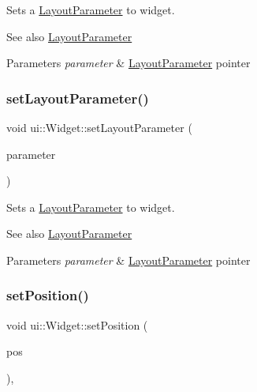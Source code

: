 Sets a \hyperlink{classui_1_1LayoutParameter}{Layout\+Parameter} to widget.

\begin{DoxySeeAlso}{See also}
\hyperlink{classui_1_1LayoutParameter}{Layout\+Parameter} 
\end{DoxySeeAlso}

\begin{DoxyParams}{Parameters}
{\em parameter} & \hyperlink{classui_1_1LayoutParameter}{Layout\+Parameter} pointer \\
\hline
\end{DoxyParams}
\mbox{\label{classui_1_1Widget_abf9d727a2726259f82c097543d0be2d1}} 
\subsubsection{\texorpdfstring{set\+Layout\+Parameter()}{setLayoutParameter()}\hspace{0.1cm}{\footnotesize\ttfamily [2/2]}}
{\footnotesize\ttfamily void ui\+::\+Widget\+::set\+Layout\+Parameter (\begin{DoxyParamCaption}\item[{\hyperlink{classui_1_1LayoutParameter}{Layout\+Parameter} $\ast$}]{parameter }\end{DoxyParamCaption})}

Sets a \hyperlink{classui_1_1LayoutParameter}{Layout\+Parameter} to widget.

\begin{DoxySeeAlso}{See also}
\hyperlink{classui_1_1LayoutParameter}{Layout\+Parameter} 
\end{DoxySeeAlso}

\begin{DoxyParams}{Parameters}
{\em parameter} & \hyperlink{classui_1_1LayoutParameter}{Layout\+Parameter} pointer \\
\hline
\end{DoxyParams}
\mbox{\label{classui_1_1Widget_ad1983665a8a2463e77c9ff7e13fcac97}} 
\subsubsection{\texorpdfstring{set\+Position()}{setPosition()}\hspace{0.1cm}{\footnotesize\ttfamily [1/2]}}
{\footnotesize\ttfamily void ui\+::\+Widget\+::set\+Position (\begin{DoxyParamCaption}\item[{const \hyperlink{classVec2}{Vec2} \&}]{pos }\end{DoxyParamCaption})\hspace{0.3cm}{\ttfamily [override]}, {\ttfamily [virtual]}}

